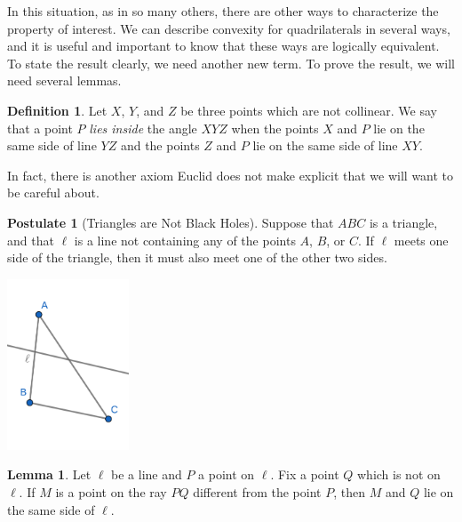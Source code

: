 \documentclass{tufte-handout}
\theoremstyle{definition}
\newtheorem{definition}[theorem]{Definition}
\newtheorem{lemma}[theorem]{Lemma}
\newtheorem{postulate}[theorem]{Postulate}
\begin{document}
In this situation, as in so many others, there are other ways to characterize the property of interest. We can describe convexity for quadrilaterals in several ways, and it is useful and important to know that these ways are logically equivalent. To state the result clearly, we need another new term. To prove the result, we will need several lemmas.


\begin{definition}
Let $X$, $Y$, and $Z$ be three points which are not collinear. We say that a point $P$ \emph{lies inside} the angle $XYZ$ when the points $X$ and $P$ lie on the same side of line $YZ$ and the points $Z$ and $P$ lie on the same side of line $XY$.
\end{definition}


In fact, there is another axiom Euclid does not make explicit that we will want to be careful about.

\begin{postulate}[Triangles are Not Black Holes]
Suppose that $ABC$ is a triangle, and that $\ell$ is a line not containing any of the points $A$, $B$, or $C$. If $\ell$ meets one side of the triangle, then it must also meet one of the other two sides.
\end{postulate}

\begin{marginfigure}
  \includegraphics[height=2in]{images/pasch.png}
\end{marginfigure}




\begin{lemma}\label{lemma:same-side-ray}
Let  $\ell$ be a line and $P$ a point on $\ell$. Fix a point $Q$ which is not on $\ell$. If $M$ is a point on the ray $PQ$ different from the point $P$, then $M$ and $Q$ lie on the same side of $\ell$.
\end{lemma}
\end{document}
